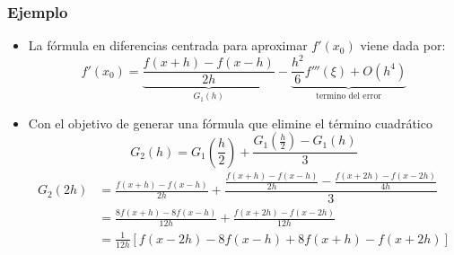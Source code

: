 \documentclass[12pt]{beamer}
\begin{document}
\frame
{
\frametitle{Ejemplo}
\begin{itemize}
  \item La f\'ormula en diferencias centrada para aproximar $f'(x_0)$ viene dada por:
  {\small
  $$
  f'(x_0) = \underbrace{\dfrac{f(x+h)-f(x-h)}{2h}}_{G_1(h)}-\underbrace{\dfrac{h^2}{6}f'''(\xi)+O(h^4)}_{\text{termino del error}}  
  $$}
  \item<2-> Con el objetivo de generar una f\'ormula que elimine el t\'ermino cuadr\'atico
  {\small
  $$
  G_2(h) = G_1\left(\frac{h}{2}\right) + \dfrac{G_1\left(\frac{h}{2}\right)-G_1(h)}{3}  
  $$
  \begin{align*}
    G_2(2h) & = \frac{f(x+h)-f(x-h)}{2h}+\dfrac{\frac{f(x+h)-f(x-h)}{2h}-\frac{f(x+2h)-f(x-2h)}{4h}}{3}\\
    & = \frac{8f(x+h)-8f(x-h)}{12h}+\frac{f(x+2h)-f(x-2h)}{12h}\\
    & = \frac{1}{12h}\left[f(x-2h)-8f(x-h)+8f(x+h)-f(x+2h)\right]  
  \end{align*}}
\end{itemize}
}  
\end{document}
